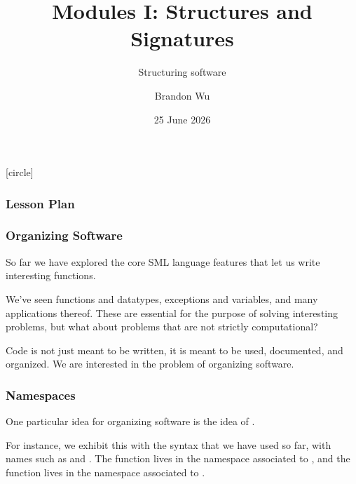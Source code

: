 \documentclass[aspectratio=169]{beamer}
\title{Modules I: Structures and Signatures} %
\subtitle{Structuring software} %
\date{25 June 2026} %
\author{Brandon Wu} %
\newif\ifcolorlambda
\begin{document}
\ifweb
    \renewcommand{\pause}{}
\fi

[circle]

{
\begin{frame}[plain]
    \colorlambdatrue
    \titlepage
\end{frame}
}


\begin{frame}[fragile]
  \frametitle{Lesson Plan}

  \tableofcontents
\end{frame}


\begin{frame}[fragile]
  \frametitle{Organizing Software}

  So far we have explored the core SML language features that let us write
  interesting functions.

  \pause
  \vspace{\fill}

  We've seen functions and datatypes, exceptions and variables, and many
  applications thereof. These are essential for the purpose of solving interesting
  problems, but what about problems that are not strictly computational?

  \pause
  \vspace{\fill}

  Code is not just meant to be written, it is meant to be used,
  documented, and organized. We are interested in the problem of organizing software.
\end{frame}

\begin{frame}[fragile]
  \frametitle{Namespaces}

  One particular idea for organizing software is the idea of .

  \pause
  \vspace{\fill}


  \pause
  \vspace{\fill}

  For instance, we exhibit this with the syntax that we have used so far, with
  names such as  and . The 
  function lives in the namespace associated to , and the 
  function lives in the namespace associated to .

  \pause
  \vspace{\fill}

\end{frame}
\end{document}
